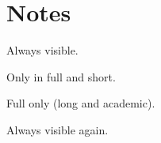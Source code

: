 \hypertarget{notes}{%
\section{Notes}\label{notes}}

Always visible.

Only in full and short.

Full only (long and academic).

Always visible again.
